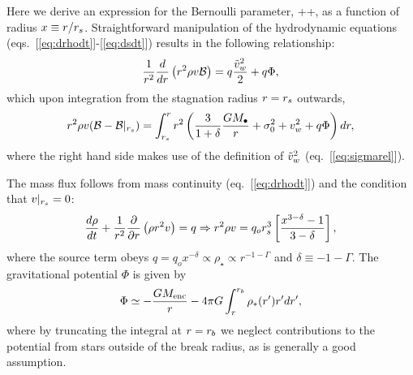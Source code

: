 Here we derive an expression for the Bernoulli parameter, \be
{} \equiv \ke +\gammaf {}+\Phi, \ee
as a function of radius $x \equiv r/r_s$.  Straightforward manipulation of the hydrodynamic equations (eqs.~[\ref{eq:drhodt}]-[\ref{eq:dsdt}]) results in the following relationship: 
\begin{align}
\frac{1}{r^2} \frac{d}{dr} \left(r^2 \rho v \mathcal{B} \right) = q \frac{\tilde{v}_{w}^2}{2} + q \Phi,
\label{eq:enCons}
\end{align}
which upon integration from the stagnation radius $r = r_s$ outwards,
\begin{align}
  r^2 \rho v(\mathcal{B} - \mathcal{B}|_{r_s})= \int_{r_s}^{r}
    r^2 \left(\frac{3}{1+\delta}\frac{G
  M_{\bullet}}{r}+\sigma_0^2+v_w^2 + q \Phi\right) dr,
    \label{eq:enConsInt}
\end{align}
where the right hand side makes use of the definition of $\tilde{v}_{w}^{2}$ (eq.~[\ref{eq:sigmarel}]).

The mass flux follows from mass continuity (eq.~[\ref{eq:drhodt}]) and the condition that $v|_{r_s} = 0$:
\begin{equation}
 \frac{d \rho}{d t}+\frac{1}{r^2}\frac{\partial}{\partial r}\left(\rho r^2 v\right)=q \Rightarrow r^2 \rho v = q_o r_s^3 \left[\frac{x^{3-\delta}-1}{3-\delta}\right],
 \label{eq:massFlux}
 \end{equation}
where the source term obeys $q = q_o x^{-\delta} \propto \rho_{\star} \propto r^{-1-\Gamma}$ and $\delta \equiv -1-\Gamma$.  The gravitational potential $\Phi$ is given by
\begin{align}
\Phi \simeq -\frac{G M_{\rm enc}}{r} -4 \pi G \int_{r}^{r_b} \rho_*(r') r' dr',
\label{eq:Phi}
\end{align}
where by truncating the integral at $r = r_b$ we neglect contributions to the potential from stars outside of the break radius, as is generally a good assumption.

